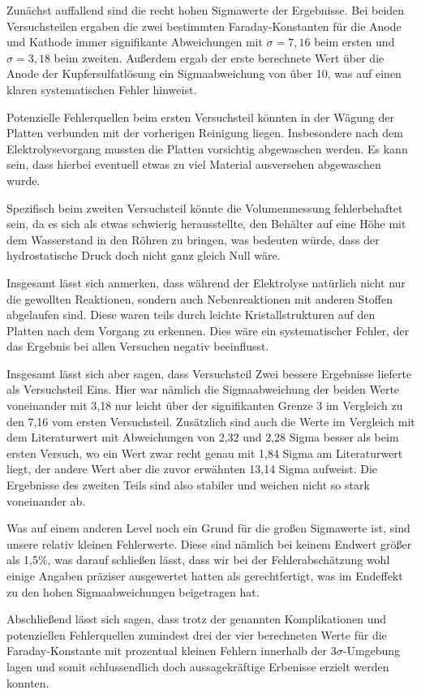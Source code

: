 \documentclass{article}
\begin{document}
Zunächst auffallend sind die recht hohen Sigmawerte der Ergebnisse. Bei beiden Versuchsteilen ergaben die zwei bestimmten Faraday-Konstanten für die Anode und Kathode immer signifikante Abweichungen mit $\sigma=7,16$ beim ersten und $\sigma = 3,18$ beim zweiten. Außerdem ergab der erste berechnete Wert über die Anode der Kupfersulfatlösung ein Sigmaabweichung von über 10, was auf einen klaren systematischen Fehler hinweist. 

Potenzielle Fehlerquellen beim ersten Versuchsteil könnten in der Wägung der Platten verbunden mit der vorherigen Reinigung liegen. Insbesondere nach dem Elektrolysevorgang mussten die Platten vorsichtig abgewaschen werden. Es kann sein, dass hierbei eventuell etwas zu viel Material ausversehen abgewaschen wurde. 

Spezifisch beim zweiten Versuchsteil könnte die Volumenmessung fehlerbehaftet sein, da es sich als etwas schwierig herausstellte, den Behälter auf eine Höhe mit dem Wasserstand in den Röhren zu bringen, was bedeuten würde, dass der hydrostatische Druck doch nicht ganz gleich Null wäre. 

Insgesamt lässt sich anmerken, dass während der Elektrolyse natürlich nicht nur die gewollten Reaktionen, sondern auch Nebenreaktionen mit anderen Stoffen abgelaufen sind. Diese waren teils durch leichte Kristallstrukturen auf den Platten nach dem Vorgang zu erkennen. Dies wäre ein systematischer Fehler, der das Ergebnis bei allen Versuchen negativ beeinflusst. 

Insgesamt lässt sich aber sagen, dass Versuchsteil Zwei bessere Ergebnisse lieferte als Versuchsteil Eins. Hier war nämlich die Sigmaabweichung der beiden Werte voneinander mit 3,18 nur leicht über der signifikanten Grenze 3 im Vergleich zu den 7,16 vom ersten Versuchsteil. Zusätzlich sind auch die Werte im Vergleich mit dem Literaturwert mit Abweichungen von 2,32 und 2,28 Sigma besser als beim ersten Versuch, wo ein Wert zwar recht genau mit 1,84 Sigma am Literaturwert liegt, der andere Wert aber die zuvor erwähnten 13,14 Sigma aufweist. Die Ergebnisse des zweiten Teils sind also stabiler und weichen nicht so stark voneinander ab. 

Was auf einem anderen Level noch ein Grund für die großen Sigmawerte ist, sind unsere relativ kleinen Fehlerwerte. Diese sind nämlich bei keinem Endwert größer als 1,5\%, was darauf schließen lässt, dass wir bei der Fehlerabschätzung wohl einige Angaben präziser ausgewertet hatten als gerechtfertigt, was im Endeffekt zu den hohen Sigmaabweichungen beigetragen hat.

Abschließend lässt sich sagen, dass trotz der genannten Komplikationen und potenziellen Fehlerquellen zumindest drei der vier berechneten Werte für die Faraday-Konstante mit prozentual kleinen Fehlern innerhalb der 3$\sigma$-Umgebung lagen und somit schlussendlich doch aussagekräftige Erbenisse erzielt werden konnten.   
\end{document}
